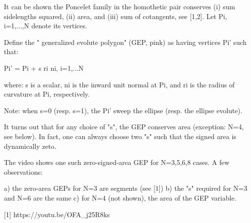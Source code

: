 It can be shown the Poncelet family in the homothetic pair conserves (i) sum sidelengths squared, (ii) area, and (iii) sum of cotangents, see [1,2]. Let Pi, i=1,...,N denote its vertices.

Define the " generalized evolute polygon" (GEP, pink) as having vertices Pi' such that:

Pi' = Pi + s ri ni,    i=1,...N

where: s is a scalar, ni is the inward unit normal at Pi, and ri is the radius of curvature at Pi, respectively.

Note: when s=0 (resp. s=1), the Pi' sweep the ellipse (resp. the ellipse evolute). 

It turns out that for any choice of "s", the GEP conserves area (exception: N=4, see below). In fact, one can always choose two "s" such that the signed area is dynamically zeto.

The video shows one such zero-signed-area GEP for N=3,5,6,8 cases.  A few observations:

a) the zero-area GEPs for N=3 are segments (see [1])
b) the "s" required for N=3 and N=6 are the same
c) for N=4 (not shown), the area of the GEP variable.

[1] https://youtu.be/OFA_j25R8ks